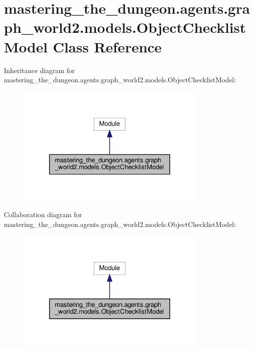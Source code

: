 \hypertarget{classmastering__the__dungeon_1_1agents_1_1graph__world2_1_1models_1_1ObjectChecklistModel}{}\section{mastering\+\_\+the\+\_\+dungeon.\+agents.\+graph\+\_\+world2.\+models.\+Object\+Checklist\+Model Class Reference}
\label{classmastering__the__dungeon_1_1agents_1_1graph__world2_1_1models_1_1ObjectChecklistModel}


Inheritance diagram for mastering\+\_\+the\+\_\+dungeon.\+agents.\+graph\+\_\+world2.\+models.\+Object\+Checklist\+Model\+:
\nopagebreak
\begin{figure}[H]
\begin{center}
\leavevmode
\includegraphics[width=264pt]{classmastering__the__dungeon_1_1agents_1_1graph__world2_1_1models_1_1ObjectChecklistModel__inherit__graph}
\end{center}
\end{figure}


Collaboration diagram for mastering\+\_\+the\+\_\+dungeon.\+agents.\+graph\+\_\+world2.\+models.\+Object\+Checklist\+Model\+:
\nopagebreak
\begin{figure}[H]
\begin{center}
\leavevmode
\includegraphics[width=264pt]{classmastering__the__dungeon_1_1agents_1_1graph__world2_1_1models_1_1ObjectChecklistModel__coll__graph}
\end{center}
\end{figure}
